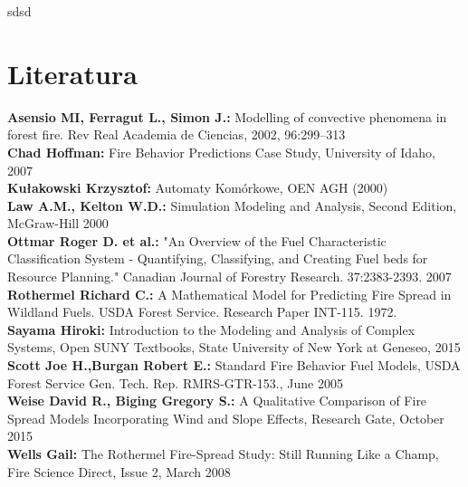 \documentclass[a4paper, 11pt]{article}
\begin{document}
	sdsd
	\section{Literatura}
	
\textbf{Asensio MI, Ferragut L., Simon J.:} Modelling of convective phenomena in forest fire. Rev Real Academia de Ciencias, 2002, 96:299–313\\
\textbf{Chad Hoffman:} Fire Behavior Predictions Case Study, University of Idaho, 2007\\
\textbf{Kułakowski Krzysztof:} Automaty Komórkowe, OEN AGH (2000) \\
\textbf{Law A.M., Kelton W.D.:} Simulation Modeling and Analysis, Second Edition, McGraw-Hill 2000\\
\textbf{Ottmar Roger D. et al.:} "An Overview of the Fuel Characteristic Classification System - Quantifying, Classifying, and Creating Fuel beds for Resource Planning." Canadian Journal of Forestry Research. 37:2383-2393. 2007\\
\textbf{Rothermel Richard C.:} A Mathematical Model for Predicting Fire Spread in Wildland Fuels. USDA Forest Service. Research Paper INT-115. 1972.\\
\textbf{Sayama Hiroki:} Introduction to the Modeling and Analysis of Complex Systems, Open SUNY Textbooks, State University of New York at Geneseo, 2015\\	
\textbf{Scott Joe H.,Burgan Robert E.:} Standard Fire Behavior Fuel Models, USDA Forest Service Gen. Tech. Rep. RMRS-GTR-153., June 2005\\	
\textbf{Weise David R., Biging Gregory S.:} A Qualitative Comparison of Fire Spread Models Incorporating Wind and Slope Effects, Research Gate, October 2015\\
\textbf{Wells Gail:} The Rothermel Fire-Spread Study: Still Running Like a Champ, Fire Science Direct, Issue 2, March 2008\\




\end{document}
